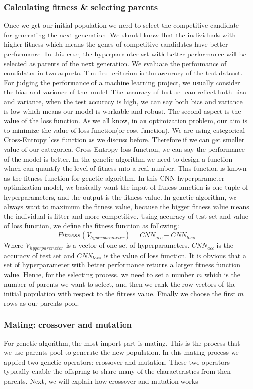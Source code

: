 \documentclass[12pt]{article}
\begin{document}
\subsubsection{Calculating fitness \& selecting parents}
Once we get our initial population we need to select the competitive candidate for generating the next generation. We should know that the individuals with higher fitness which means the genes of competitive candidates have better performance. In this case, the hyperparamter set with better performance will be selected as parents of the next generation. We evaluate the performance of candidates in two aspects. The first criterion is the accuracy of the test dataset. For judging the performance of a machine learning project, we usually consider the bias and variance of the model. The accuracy of test set can reflect both bias and variance, when the test accuracy is high, we can say both bias and variance is low which means our model is workable and robust. The second aspect is the value of the loss function. As we all know, in an optimization problem, our aim is to minimize the value of loss function(or cost function). We are using  categorical Cross-Entropy loss function as we discuss before. Therefore if we can get smaller value of our categorical Cross-Entropy loss function, we can say the performance of the model is better. In the genetic algorithm we need to design a function which can quantify the level of fitness into a real number. This function is known as the fitness function for genetic algorithm. In this CNN hyperparameter optimization model, we basically want the input of fitness function is one tuple of hyperparameters, and the output is the fitness value. In genetic algorithm, we always want to maximum the fitness value, because the bigger fitness value means the individual is fitter and more competitive. Using accuracy of test set and value of loss function, we define the fitness function as following:
$$Fitness(V_{hyperparemeter}) =  CNN_{acc} - CNN_{loss}$$
Where $V_{hyperparemeter}$ is a vector of one set of hyperparameters.  $CNN_{acc}$ is the accuracy of test set and $ CNN_{loss}$ is the value of loss function. It is obvious that a set of hyperparameter with better performance returns a larger fitness function value. Hence, for the selecting process, we need to set a number $m$ which is the number of parents we want to select, and then we rank the row vectors of the initial population with respect to the fitness value. Finally we choose the first $m$ rows as our parents pool.\\
\subsubsection{Mating: crossover and mutation}
For genetic algorithm, the most import part is mating. This is the process that we use parents pool to generate the new population. In this mating process we applied two genetic operators: crossover and mutation. These two operators typically enable the offspring to share many of the characteristics from their parents. Next, we will explain how crossover and mutation works.
\end{document}
